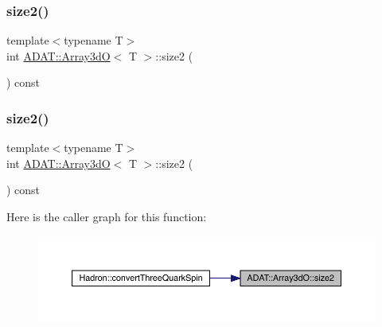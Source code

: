 \mbox{\label{classADAT_1_1Array3dO_ab4a1fc3cfddf9238d7ab3fefac03ad18}} 
\subsubsection{\texorpdfstring{size2()}{size2()}\hspace{0.1cm}{\footnotesize\ttfamily [1/2]}}
{\footnotesize\ttfamily template$<$typename T$>$ \\
int \mbox{\hyperlink{classADAT_1_1Array3dO}{A\+D\+A\+T\+::\+Array3dO}}$<$ T $>$\+::size2 (\begin{DoxyParamCaption}{ }\end{DoxyParamCaption}) const\hspace{0.3cm}{\ttfamily [inline]}}

\mbox{\label{classADAT_1_1Array3dO_ab4a1fc3cfddf9238d7ab3fefac03ad18}} 
\subsubsection{\texorpdfstring{size2()}{size2()}\hspace{0.1cm}{\footnotesize\ttfamily [2/2]}}
{\footnotesize\ttfamily template$<$typename T$>$ \\
int \mbox{\hyperlink{classADAT_1_1Array3dO}{A\+D\+A\+T\+::\+Array3dO}}$<$ T $>$\+::size2 (\begin{DoxyParamCaption}{ }\end{DoxyParamCaption}) const\hspace{0.3cm}{\ttfamily [inline]}}

Here is the caller graph for this function\+:\nopagebreak
\begin{figure}[H]
\begin{center}
\leavevmode
\includegraphics[width=350pt]{dd/da8/classADAT_1_1Array3dO_ab4a1fc3cfddf9238d7ab3fefac03ad18_icgraph}
\end{center}
\end{figure}
\mbox{\label{classADAT_1_1Array3dO_acd5ccea08cb9cde541a396823af21161}} 
